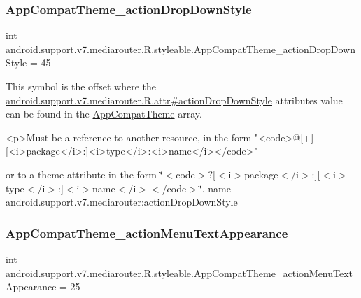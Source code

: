 \subsubsection{\texorpdfstring{App\+Compat\+Theme\+\_\+action\+Drop\+Down\+Style}{AppCompatTheme\_actionDropDownStyle}}
{\footnotesize\ttfamily int android.\+support.\+v7.\+mediarouter.\+R.\+styleable.\+App\+Compat\+Theme\+\_\+action\+Drop\+Down\+Style = 45\hspace{0.3cm}{\ttfamily [static]}}

This symbol is the offset where the \hyperlink{classandroid_1_1support_1_1v7_1_1mediarouter_1_1R_1_1attr_ac4639a46ffc10412d641f375f6506d21}{android.\+support.\+v7.\+mediarouter.\+R.\+attr\#action\+Drop\+Down\+Style} attribute\textquotesingle{}s value can be found in the \hyperlink{classandroid_1_1support_1_1v7_1_1mediarouter_1_1R_1_1styleable_a4e3d3900c75d49aeb2f283cac00214d6}{App\+Compat\+Theme} array.

\begin{DoxyVerb}      <p>Must be a reference to another resource, in the form "<code>@[+][<i>package</i>:]<i>type</i>:<i>name</i></code>"
\end{DoxyVerb}
 or to a theme attribute in the form \char`\"{}$<$code$>$?\mbox{[}$<$i$>$package$<$/i$>$\+:\mbox{]}\mbox{[}$<$i$>$type$<$/i$>$\+:\mbox{]}$<$i$>$name$<$/i$>$$<$/code$>$\char`\"{}.  name android.\+support.\+v7.\+mediarouter\+:action\+Drop\+Down\+Style \mbox{\label{classandroid_1_1support_1_1v7_1_1mediarouter_1_1R_1_1styleable_a0dd3111866a20427ceb1e13b7f1e794d}} 
\subsubsection{\texorpdfstring{App\+Compat\+Theme\+\_\+action\+Menu\+Text\+Appearance}{AppCompatTheme\_actionMenuTextAppearance}}
{\footnotesize\ttfamily int android.\+support.\+v7.\+mediarouter.\+R.\+styleable.\+App\+Compat\+Theme\+\_\+action\+Menu\+Text\+Appearance = 25\hspace{0.3cm}{\ttfamily [static]}}


